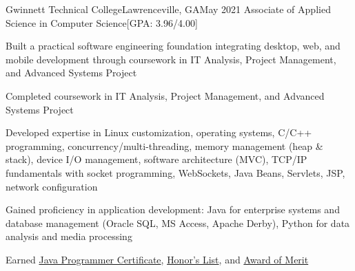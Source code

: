 \begin{resume-itemize}
  {Gwinnett Technical College}{Lawrenceville, GA}{May 2021}
  {Associate of Applied Science in Computer Science}[GPA: 3.96/4.00]
    \item Built a practical software engineering foundation integrating desktop, web, and mobile development through coursework in IT Analysis, Project Management, and Advanced Systems Project
    \item Completed coursework in IT Analysis, Project Management, and Advanced Systems Project
    \item Developed expertise in Linux customization, operating systems, 
    C/C++ programming, concurrency/multi-threading, 
    memory management (heap \& stack), device I/O management,
    software architecture (MVC), 
    TCP/IP fundamentals with socket programming, 
    WebSockets, Java Beans, Servlets, JSP, network configuration
    \item Gained proficiency in application development: Java for enterprise systems and database management (Oracle SQL, MS Access, Apache Derby), 
    Python for data analysis and media processing
    \item Earned \href{https://yundaeleesong.github.io/2105-GraduateAward-JavaProgrammer.pdf}{Java Programmer Certificate}, 
    \href{https://yundaeleesong.github.io/1911-HonorsList.pdf}{Honor's List}, and 
    \href{https://yundaeleesong.github.io/2105-MeritAward.pdf}{Award of Merit}
\end{resume-itemize}

